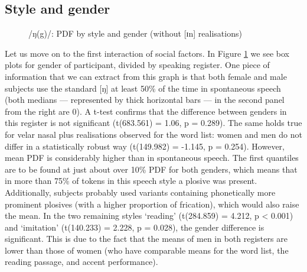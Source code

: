 \subsection{Style and gender}
\label{sec.prod.res.con.ng.stylegender}

\begin{figure}[h]
	\centering
		\resizebox{.49\linewidth}{!}{} 
	\caption{/ŋ(g)/: PDF by style and gender (without [ɪn] realisations)}
	\label{fig.box.ng.stylegender}
\end{figure}

Let us move on to the first interaction of social factors.
In Figure \ref{fig.box.ng.stylegender} we see box plots for gender of participant, divided by speaking register.
One piece of information that we can extract from this graph is that both female and male subjects use the standard [ŋ] at least 50\% of the time in spontaneous speech (both medians --- represented by thick horizontal bars --- in the second panel from the right are 0).
A t-test confirms that the difference between genders in this register is not significant (t(683.561) = 1.06, p = 0.289).
The same holds true for velar nasal plus realisations observed for the word list: women and men do not differ in a statistically robust way (t(149.982) = -1.145, p = 0.254).
However, mean PDF is considerably higher than in spontaneous speech.
The first quantiles are to be found at just about over 10\% PDF for both genders, which means that in more than 75\% of tokens in this speech style a plosive was present.
Additionally, subjects probably used variants containing phonetically more prominent plosives (with a higher proportion of frication), which would also raise the mean.
In the two remaining styles `reading' (t(284.859) = 4.212, p < 0.001) and `imitation' (t(140.233) = 2.228, p = 0.028), the gender difference is significant.
This is due to the fact that the means of men in both registers are lower than those of women (who have comparable means for the word list, the reading passage, and accent performance).

